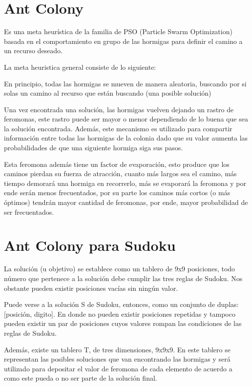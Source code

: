 \documentclass[a4paper,spanish]{article}
\begin{document}
\clearpage


\section{Ant Colony}

Es una meta heurística de la familia de PSO (Particle Swarm Optimization) basada en el comportamiento en grupo 
de las hormigas para definir el camino a un recurso deseado.

La meta heuristica general consiste de lo siguiente:

En principio, todas las hormigas se mueven de manera aleatoria, buscando por si solas un camino 
al recurso que están buscando (una posible solución)

Una vez encontrada una solución, las hormigas vuelven dejando un rastro de feromonas, 
este rastro puede ser mayor o menor dependiendo de lo buena que sea la solución encontrada.
Además, este mecanismo es utilizado para compartir información entre todas las hormigas de la colonia 
dado que su valor aumenta las probabilidades de que una siguiente hormiga siga sus pasos.

Esta feromona además tiene un factor de evaporación, esto produce que los caminos pierdan su 
fuerza de atracción, cuanto más largos sea el camino, más tiempo demorará una hormiga en recorrerlo, 
más se evaporará la feromona y por ende serán menos frecuentados, por su parte los caminos más cortos 
(o más óptimos) tendrán mayor cantidad de feromonas, por ende, mayor probabilidad de ser frecuentados.

\section{Ant Colony para Sudoku}

La solución (u objetivo) se establece como un tablero de 9x9 posiciones, todo número que pertenece a la 
solución debe cumplir las tres reglas de Sudoku. Nos obstante pueden existir posiciones vacías sin ningún valor.

Puede verse a la solución S de Sudoku, entonces, como un conjunto de duplas: [posición, digito]. En donde no pueden
existir posiciones repetidas y tampoco pueden existir un par de posiciones cuyos valores rompan las condiciones de 
las reglas de Sudoku.

Además, existe un tablero T, de tres dimensiones, 9x9x9. En este tablero se representan las posibles soluciones
que van encontrando las hormigas y será utilizado para depositar el valor de feromona de cada elemento de acuerdo
a como este pueda o no ser parte de la solución final.
\end{document}
